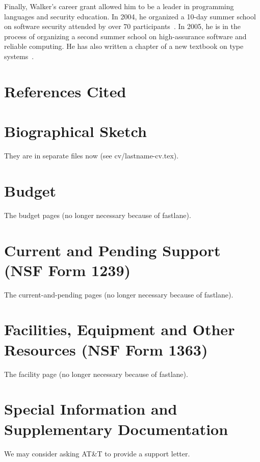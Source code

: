 \documentclass[11pt]{article}
\begin{document}
Finally, Walker's career grant allowed him to be a leader in
programming languages and security education. In 2004, he organized
a 10-day summer school on software security 
attended by over 70 participants~\cite{summerschool04}.  In 2005, he is in the process of
organizing a second summer school on high-assurance software and reliable computing.  He has also written a
chapter of a new textbook on type systems~\cite{walker:attapl}.



\newpage
\section{References Cited}
{
 \small
} \newpage
\section{Biographical Sketch}
%

They are in separate files now (see cv/lastname-cv.tex).

\section{Budget}

The budget pages (no longer necessary because of fastlane). 

\section{Current and Pending Support (NSF Form 1239)}

The current-and-pending pages (no longer necessary because of fastlane). 

\section{Facilities, Equipment and Other Resources (NSF Form 1363)}

The facility page (no longer necessary because of fastlane).

\section{Special Information and Supplementary Documentation}

We may consider asking AT\&{}T to provide a support letter.
\end{document}
